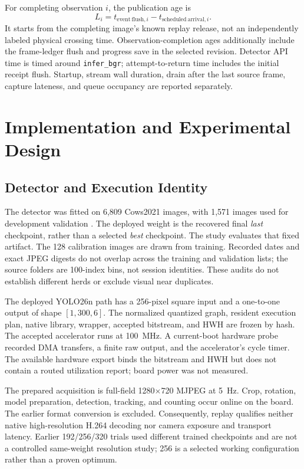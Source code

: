 \documentclass[journal]{IEEEtran}
\begin{document}
For completing observation $i$, the publication age is
\begin{equation}
 L_i=t_{\mathrm{event\ flush},i}-t_{\mathrm{scheduled\ arrival},i}.
\end{equation}
It starts from the completing image's known replay release, not an independently labeled physical crossing time. Observation-completion ages additionally include the frame-ledger flush and progress save in the selected revision. Detector API time is timed around \texttt{infer\_bgr}; attempt-to-return time includes the initial receipt flush. Startup, stream wall duration, drain after the last source frame, capture lateness, and queue occupancy are reported separately.

\section{Implementation and Experimental Design}
\subsection{Detector and Execution Identity}
The detector was fitted on 6,809 Cows2021 images, with 1,571 images used for development validation \cite{cows2021_data}. The deployed weight is the recovered final \emph{last} checkpoint, rather than a selected \emph{best} checkpoint. The study evaluates that fixed artifact. The 128 calibration images are drawn from training. Recorded dates and exact JPEG digests do not overlap across the training and validation lists; the source folders are 100-index bins, not session identities. These audits do not establish different herds or exclude visual near duplicates.

The deployed YOLO26n path \cite{yolo26} has a 256-pixel square input and a one-to-one output of shape $[1,300,6]$. The normalized quantized graph, resident execution plan, native library, wrapper, accepted bitstream, and HWH are frozen by hash. The accepted accelerator runs at 100~MHz. A current-boot hardware probe recorded DMA transfers, a finite raw output, and the accelerator's cycle timer. The available hardware export binds the bitstream and HWH but does not contain a routed utilization report; board power was not measured.

The prepared acquisition is full-field 1280$\times$720 MJPEG at 5~Hz. Crop, rotation, model preparation, detection, tracking, and counting occur online on the board. The earlier format conversion is excluded. Consequently, replay qualifies neither native high-resolution H.264 decoding nor camera exposure and transport latency. Earlier 192/256/320 trials used different trained checkpoints and are not a controlled same-weight resolution study; 256 is a selected working configuration rather than a proven optimum.
\end{document}
